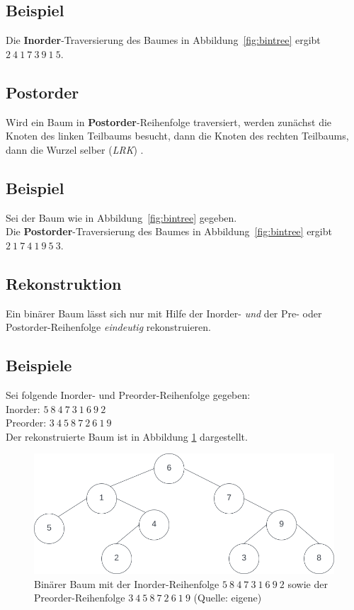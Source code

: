 \subsection*{Beispiel}
Die \textbf{Inorder}-Traversierung des Baumes in Abbildung~\ref{fig:bintree} ergibt $2\ 4\ 1\ 7\ 3\ 9\ 1\ 5$.


\subsection{Postorder}
Wird ein Baum in \textbf{Postorder}-Reihenfolge traversiert, werden zunächst die Knoten des linken Teilbaums besucht, dann die Knoten des rechten Teilbaums, dann die Wurzel selber (\textit{LRK}) .

\subsection*{Beispiel}
Sei der Baum wie in Abbildung~\ref{fig:bintree} gegeben.\\

\noindent
Die \textbf{Postorder}-Traversierung des Baumes in Abbildung~\ref{fig:bintree} ergibt $2\ 1\ 7\ 4\ 1\ 9\ 5\ 3$.

\subsection{Rekonstruktion}
Ein binärer Baum lässt sich nur mit Hilfe der Inorder- \textit{und} der Pre- oder Postorder-Reihenfolge \textit{eindeutig} rekonstruieren.

\subsection*{Beispiele}
Sei folgende Inorder- und Preorder-Reihenfolge gegeben:\\

\noindent
Inorder: $5\ 8\ 4\ 7\ 3\ 1\ 6\ 9\ 2$\\
Preorder: $3\ 4\ 5\ 8\ 7\ 2\ 6\ 1\ 9$\\

\noindent
Der rekonstruierte Baum ist in Abbildung \ref{fig:inpre} dargestellt.\\

\begin{figure}
    \begin{center}
        \includegraphics[scale=0.4]{chapters/Datenstrukturen und Algorithmen/img/inpost}
        \caption{Binärer Baum mit der Inorder-Reihenfolge $5\ 8\ 4\ 7\ 3\ 1\ 6\ 9\ 2$ sowie der Preorder-Reihenfolge $3\ 4\ 5\ 8\ 7\ 2\ 6\ 1\ 9$  (Quelle: eigene)}
        \label{fig:inpre}
    \end{center}
\end{figure}


